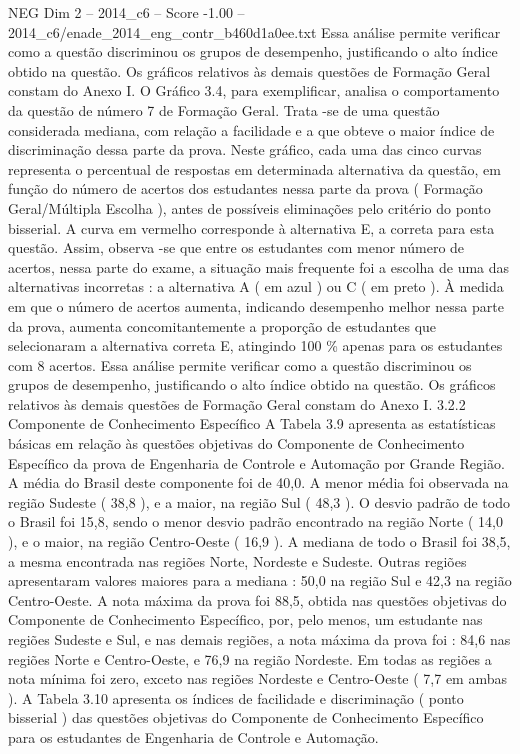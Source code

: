 \begin{textsample}{NEG Dim 2 – 2014\_c6 – Score -1.00 – 2014\_c6/enade\_2014\_eng\_contr\_b460d1a0ee.txt}
Essa análise permite verificar como a questão discriminou os grupos de desempenho, justificando o alto índice obtido na questão.
Os gráficos relativos às demais questões de Formação Geral constam do Anexo I.
O Gráfico 3.4, para exemplificar, analisa o comportamento da questão de número 7 de Formação Geral.
Trata -se de uma questão considerada mediana, com relação a facilidade e a que obteve o maior índice de discriminação dessa parte da prova.
Neste gráfico, cada uma das cinco curvas representa o percentual de respostas em determinada alternativa da questão, em função do número de acertos dos estudantes nessa parte da prova ( Formação Geral/Múltipla Escolha ), antes de possíveis eliminações pelo critério do ponto bisserial.
A curva em vermelho corresponde à alternativa E, a correta para esta questão.
Assim, observa -se que entre os estudantes com menor número de acertos, nessa parte do exame, a situação mais frequente foi a escolha de uma das alternativas incorretas : a alternativa A ( em azul ) ou C ( em preto ).
À medida em que o número de acertos aumenta, indicando desempenho melhor nessa parte da prova, aumenta concomitantemente a proporção de estudantes que selecionaram a alternativa correta E, atingindo 100 \% apenas para os estudantes com 8 acertos.
Essa análise permite verificar como a questão discriminou os grupos de desempenho, justificando o alto índice obtido na questão.
Os gráficos relativos às demais questões de Formação Geral constam do Anexo I. 3.2.2 Componente de Conhecimento Específico A Tabela 3.9 apresenta as estatísticas básicas em relação às questões objetivas do Componente de Conhecimento Específico da prova de Engenharia de Controle e Automação por Grande Região.
A média do Brasil deste componente foi de 40,0.
A menor média foi observada na região Sudeste ( 38,8 ), e a maior, na região Sul ( 48,3 ).
O desvio padrão de todo o Brasil foi 15,8, sendo o menor desvio padrão encontrado na região Norte ( 14,0 ), e o maior, na região Centro-Oeste ( 16,9 ).
A mediana de todo o Brasil foi 38,5, a mesma encontrada nas regiões Norte, Nordeste e Sudeste.
Outras regiões apresentaram valores maiores para a mediana : 50,0 na região Sul e 42,3 na região Centro-Oeste.
A nota máxima da prova foi 88,5, obtida nas questões objetivas do Componente de Conhecimento Específico, por, pelo menos, um estudante nas regiões Sudeste e Sul, e nas demais regiões, a nota máxima da prova foi : 84,6 nas regiões Norte e Centro-Oeste, e 76,9 na região Nordeste.
Em todas as regiões a nota mínima foi zero, exceto nas regiões Nordeste e Centro-Oeste ( 7,7 em ambas ).
A Tabela 3.10 apresenta os índices de facilidade e discriminação ( ponto bisserial ) das questões objetivas do Componente de Conhecimento Específico para os estudantes de Engenharia de Controle e Automação.

\end{textsample}
